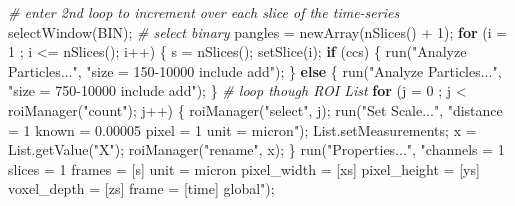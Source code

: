 \documentclass[10pt, b5paper, singlespacinge, twoside]{reedthesis} %
\newenvironment{Shaded}{}{}
\newcommand{\AttributeTok}[1]{#1}
\newcommand{\CommentTok}[1]{\textit{#1}}
\newcommand{\ControlFlowTok}[1]{\textbf{#1}}
\newcommand{\DecValTok}[1]{#1}
\newcommand{\FunctionTok}[1]{#1}
\newcommand{\NormalTok}[1]{#1}
\newcommand{\OtherTok}[1]{#1}
\newcommand{\SpecialCharTok}[1]{#1}
\newcommand{\StringTok}[1]{#1}
\theoremstyle{definition}
\theoremstyle{definition}
\theoremstyle{definition}
\theoremstyle{remark}
\begin{document}
\begin{Shaded}
\begin{Highlighting}[numbers=left,,]
\CommentTok{\# enter 2nd loop to increment over each slice of the time{-}series}
    \FunctionTok{selectWindow}\NormalTok{(BIN);   }\CommentTok{\# select binary}
\NormalTok{    pangles }\OtherTok{=} \FunctionTok{newArray}\NormalTok{(}\FunctionTok{nSlices}\NormalTok{() }\SpecialCharTok{+} \DecValTok{1}\NormalTok{);}
    \ControlFlowTok{for}\NormalTok{ (}\AttributeTok{i =} \DecValTok{1}\NormalTok{ ; i }\SpecialCharTok{\textless{}=} \FunctionTok{nSlices}\NormalTok{(); i}\SpecialCharTok{++}\NormalTok{) \{}
\NormalTok{      s }\OtherTok{=} \FunctionTok{nSlices}\NormalTok{();}
        \FunctionTok{setSlice}\NormalTok{(i);}
        \ControlFlowTok{if}\NormalTok{ (ccs) \{}
            \FunctionTok{run}\NormalTok{(}\StringTok{"Analyze Particles..."}\NormalTok{,}
                \StringTok{"size = 150{-}10000 include add"}\NormalTok{);}
\NormalTok{        \} }\ControlFlowTok{else}\NormalTok{ \{}
            \FunctionTok{run}\NormalTok{(}\StringTok{"Analyze Particles..."}\NormalTok{,}
                \StringTok{"size = 750{-}10000 include add"}\NormalTok{);}
\NormalTok{        \}}
    \CommentTok{\# loop though ROI List}
        \ControlFlowTok{for}\NormalTok{ (}\AttributeTok{j =} \DecValTok{0}\NormalTok{ ; j }\SpecialCharTok{\textless{}} \FunctionTok{roiManager}\NormalTok{(}\StringTok{"count"}\NormalTok{); j}\SpecialCharTok{++}\NormalTok{) \{}
            \FunctionTok{roiManager}\NormalTok{(}\StringTok{"select"}\NormalTok{, j);}
            \FunctionTok{run}\NormalTok{(}\StringTok{"Set Scale..."}\NormalTok{,}
                \StringTok{"distance = 1 known = 0.00005 pixel = 1 unit = micron"}\NormalTok{);}
\NormalTok{            List.setMeasurements;}
\NormalTok{            x }\OtherTok{=} \FunctionTok{List.getValue}\NormalTok{(}\StringTok{"X"}\NormalTok{);}
            \FunctionTok{roiManager}\NormalTok{(}\StringTok{"rename"}\NormalTok{, x);}
\NormalTok{        \}}
        \FunctionTok{run}\NormalTok{(}\StringTok{"Properties..."}\NormalTok{,}
            \StringTok{"channels = 1 slices = 1 frames = [s] unit = micron pixel\_width = [xs]}
\StringTok{            pixel\_height = [ys] voxel\_depth = [zs] frame = [time] global"}\NormalTok{);}
        

\end{Highlighting}
\end{Shaded}
\end{document}
